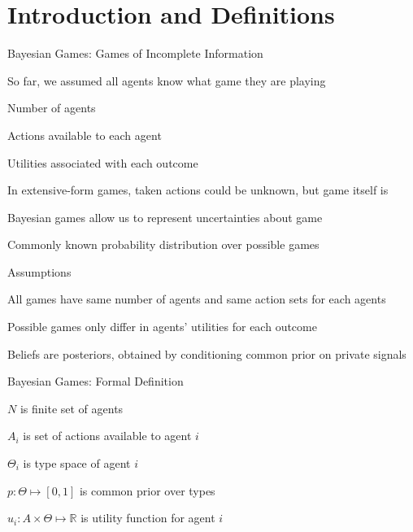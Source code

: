 \documentclass[11pt,aspectratio=169]{beamer}
\subtitle{\vspace{2.1em}Lecture 8: Bayesian Games}
\begin{document}
 \begin{frame}[plain]
  \titlepage
 \end{frame} 
 
 \section{Introduction and Definitions}
 
  \begin{frame}{Bayesian Games: Games of Incomplete Information}
   \begin{itemizes}[1.2em]
    \item So far, we assumed \alert{all agents know} what game they are playing
    \begin{itemizes}[0.5em]
     \item Number of agents
     \item Actions available to each agent
     \item Utilities associated with each outcome
    \end{itemizes}
    \item In extensive-form games, \alert{taken actions} could be unknown, but \alert{game itself} is
    \item \alert{Bayesian games} allow us to represent uncertainties about game
    \begin{itemizes}[0.5em]
     \item \alert{Commonly known probability distribution} over possible games 
    \end{itemizes}
   \end{itemizes}
  \end{frame}
  
  
  \begin{frame}{Assumptions}
   \begin{itemizes}[1.5em]
    \item All games have \alert{same number of agents} and \alert{same action sets} for each agents
    \item Possible games only differ in agents' utilities for each outcome
    \item Beliefs are \alert{posteriors}, obtained by conditioning common prior on private signals
   \end{itemizes}
  \end{frame}


  \begin{frame}{Bayesian Games: Formal Definition}
   \begin{itemizes}[1.2em]
    \item $N$ is finite set of agents
    \item $A_i$ is set of actions available to agent $i$
    \item $\Theta_i$ is type space of agent $i$
    \item $p: \Theta \mapsto [0, 1]$ is common prior over types
    \item $u_i: A \times \Theta \mapsto \mathbb{R}$ is utility function for agent $i$
   \end{itemizes}
  \end{frame}
  
\end{document}
